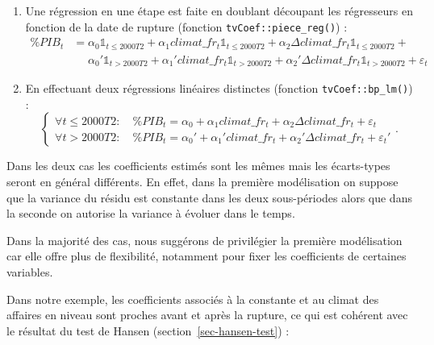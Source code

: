 \documentclass[
  a4paper,
  DIV=11,
  numbers=noendperiod,
  french]{scrartcl}
\newenvironment{Shaded}{\begin{snugshade}}{\end{snugshade}}
\newcommand{\FunctionTok}[1]{\textcolor[rgb]{0.28,0.35,0.67}{#1}}
\newcommand{\NormalTok}[1]{\textcolor[rgb]{0.00,0.23,0.31}{#1}}
\newcommand{\OtherTok}[1]{\textcolor[rgb]{0.00,0.23,0.31}{#1}}
\newcommand{\SpecialCharTok}[1]{\textcolor[rgb]{0.37,0.37,0.37}{#1}}
\newcommand\1{{\mathds 1}}
\theoremstyle{remark}
\begin{document}
\begin{enumerate}
\def\labelenumi{\arabic{enumi}.}
\item
  Une régression en une étape est faite en doublant découpant les
  régresseurs en fonction de la date de rupture (fonction
  \texttt{tvCoef::piece\_reg()}) : \begin{align*}
  \% PIB_t &= \alpha_0\1_{t\leq 2000T2} + \alpha_1 climat\_fr_t\1_{t\leq 2000T2} + \alpha_2 \Delta climat\_fr_t\1_{t\leq 2000T2} + \\
  &\phantom{=} \alpha_0'\1_{t > 2000T2} + \alpha_1' climat\_fr_t\1_{t > 2000T2} + \alpha_2' \Delta climat\_fr_t\1_{t > 2000T2} + \varepsilon_t
  \end{align*}
\item
  En effectuant deux régressions linéaires distinctes (fonction
  \texttt{tvCoef::bp\_lm()}) : \[
  \begin{cases}
  \forall t \leq 2000T2 :\quad \% PIB_t = \alpha_0 + \alpha_1 climat\_fr_t + \alpha_2 \Delta climat\_fr_t + \varepsilon_t \\
  \forall t > 2000T2 :\quad \% PIB_t = \alpha_0' + \alpha_1' climat\_fr_t + \alpha_2' \Delta climat\_fr_t + \varepsilon_t'
  \end{cases}.
  \]
\end{enumerate}

Dans les deux cas les coefficients estimés sont les mêmes mais les
écarts-types seront en général différents. En effet, dans la première
modélisation on suppose que la variance du résidu est constante dans les
deux sous-périodes alors que dans la seconde on autorise la variance à
évoluer dans le temps.

Dans la majorité des cas, nous suggérons de privilégier la première
modélisation car elle offre plus de flexibilité, notamment pour fixer
les coefficients de certaines variables.

Dans notre exemple, les coefficients associés à la constante et au
climat des affaires en niveau sont proches avant et après la rupture, ce
qui est cohérent avec le résultat du test de Hansen
(section~\ref{sec-hansen-test}) :

\begin{Shaded}
\end{Shaded}
\end{document}
